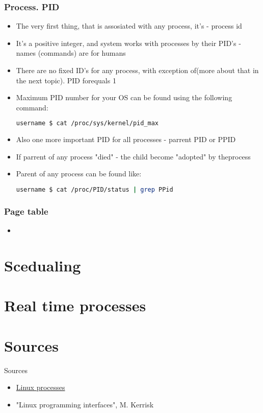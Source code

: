 \documentclass[usenames,dvipsnames,10pt,aspectratio=169]{beamer}
\begin{document}
\begin{frame}[fragile]
    \frametitle{Process. PID}
    \begin{itemize}
        \item The very first thing, that is assosiated with any process, it's - process id 
        \item It's a positive integer, and system works with processes by their PID's - names (commands) are for humans 
        \item There are no fixed ID's for any process, with exception of(more about that in the next topic). PID forequals 1
        \item Maximum PID number for your OS can be found using the following command:
        \begin{lstlisting}[language=Bash, style=shellstyle] 
username $ cat /proc/sys/kernel/pid_max\end{lstlisting}
        \item Also one more important PID for all processes - parrent PID or PPID
        \item If parrent of any process "died" - the child become "adopted" by theprocess
        \item Parent of any process can be found like:
        \begin{lstlisting}[language=Bash, style=shellstyle] 
username $ cat /proc/PID/status | grep PPid \end{lstlisting}
    \end{itemize}
\end{frame}

\begin{frame}
    \frametitle{Page table}
    \begin{itemize}
        \item 
    \end{itemize}
\end{frame}

\section{Scedualing}

\section{Real time processes}

\section{Sources}
\begin{frame}{Sources}
    \begin{itemize}
        \item \href{https://tldp.org/LDP/tlk/kernel/processes.html}{Linux processes}
        \item "Linux programming interfaces", M. Kerrisk
    \end{itemize}
\end{frame}
\end{document}
